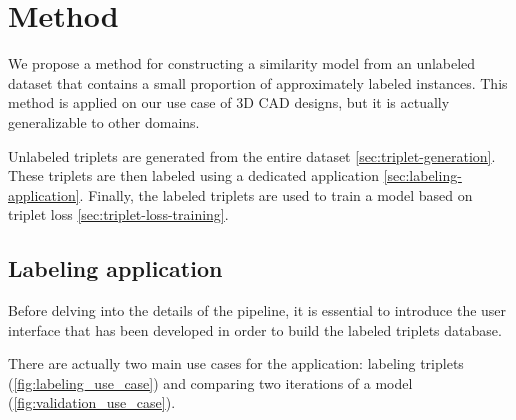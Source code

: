 \chapter{Method}
\label{sec:method}

We propose a method for constructing a similarity model from an unlabeled dataset that contains a small proportion of approximately labeled instances. This method is applied on our use case of 3D CAD designs, but it is actually generalizable to other domains. 

Unlabeled triplets are generated from the entire dataset \autoref{sec:triplet-generation}. These triplets are then labeled using a dedicated application \autoref{sec:labeling-application}. Finally, the labeled triplets are used to train a model based on triplet loss \autoref{sec:triplet-loss-training}.


\section{Labeling application}
\label{sec:labeling-application}

Before delving into the details of the pipeline, it is essential to introduce the user interface that has been developed in order to build the labeled triplets database.

There are actually two main use cases for the application: labeling triplets (\autoref{fig:labeling_use_case}) and comparing two iterations of a model (\autoref{fig:validation_use_case}).

